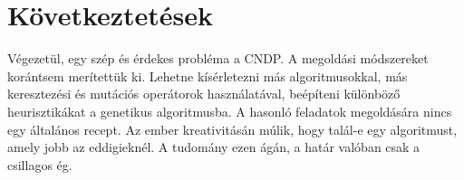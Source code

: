 \chapter{Következtetések}


Végezetül, egy szép és érdekes probléma a CNDP.
A megoldási módszereket korántsem merítettük ki.
Lehetne kísérletezni más algoritmusokkal, más keresztezési és mutációs operátorok használatával, beépíteni különböző heurisztikákat a genetikus algoritmusba.
A hasonló feladatok megoldására nincs egy általános recept.
Az ember kreativitásán múlik, hogy talál-e egy algoritmust, amely jobb az eddigieknél.
A tudomány ezen ágán, a határ valóban csak a csillagos ég.

